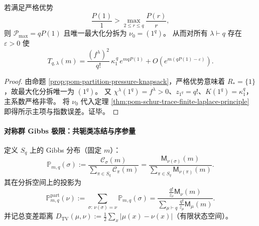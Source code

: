 \begin{corollary}[恒等扇区主导的全通道同阶塌缩]\label{cor:pom-identity-sector-collapse-all-schur-channels}
若满足严格优势
\[
\frac{P(1)}{1}>\max_{2\le r\le q}\frac{P(r)}{r},
\]
则 \(\mathcal{P}_{\max}=qP(1)\) 且唯一最大化分拆为 \(\nu_0=(1^q)\)。
从而对所有 \(\lambda\vdash q\) 存在 \(\varepsilon>0\) 使
\[
T_{q,\lambda}(m)
=
\frac{(f^\lambda)^2}{q!}\,\kappa_1^{\,q}\,e^{m qP(1)}
+O\!\left(e^{m(qP(1)-\varepsilon)}\right).
\]
\end{corollary}
\begin{proof}
由命题 \ref{prop:pom-partition-pressure-knapsack}，严格优势意味着 \(R_*=\{1\}\)，故最大化分拆唯一为 \((1^q)\)。
又 \(\chi^\lambda(1^q)=f^\lambda>0\)、\(z_{1^q}=q!\)、\(K(1^q)=\kappa_1^q\)，主系数严格非零。
将 \(\nu_0\) 代入定理 \ref{thm:pom-schur-trace-finite-laplace-principle} 即得所示主项与指数误差。证毕。
\end{proof}

\paragraph{对称群 Gibbs 极限：共轭类冻结与序参量}
定义 \(S_q\) 上的 Gibbs 分布（固定 \(m\)）：
\[
\mathbb P_{m,q}(\sigma):=\frac{\mathcal{C}_\sigma(m)}{\sum_{\pi\in S_q}\mathcal{C}_\pi(m)}
=\frac{\mathsf{M}_{\nu(\sigma)}(m)}{\sum_{\pi\in S_q}\mathsf{M}_{\nu(\pi)}(m)}.
\]
其在分拆空间上的投影为
\[
\mathbb P^{\mathrm{part}}_{m,q}(\nu)
:=
\sum_{\sigma:\,\nu(\sigma)=\nu}\mathbb P_{m,q}(\sigma)
=
\frac{\frac{q!}{z_\nu}\mathsf{M}_\nu(m)}{\sum_{\mu\vdash q}\frac{q!}{z_\mu}\mathsf{M}_\mu(m)}.
\]
并记总变差距离 \(D_{\mathrm{TV}}(\mu,\nu):=\frac12\sum_x|\mu(x)-\nu(x)|\)（有限状态空间）。


